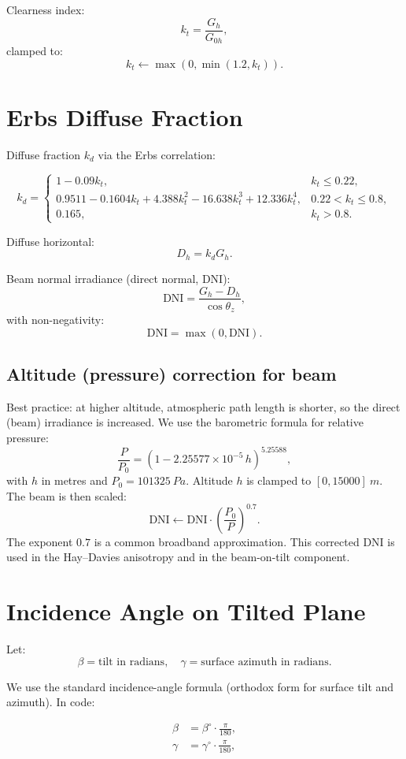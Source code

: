 \documentclass[11pt,a4paper]{article}
\begin{document}
Clearness index:
\[
  k_t = \frac{G_h}{G_{0h}},
\]
clamped to:
\[
  k_t \leftarrow \max(0, \min(1.2, k_t)).
\]

\section{Erbs Diffuse Fraction}

Diffuse fraction \(k_d\) via the Erbs correlation:

\[
k_d =
\begin{cases}
  1 - 0.09 k_t, & k_t \le 0.22,\\[6pt]
  0.9511 - 0.1604 k_t + 4.388 k_t^2 - 16.638 k_t^3 + 12.336 k_t^4, & 0.22 < k_t \le 0.8,\\[6pt]
  0.165, & k_t > 0.8.
\end{cases}
\]

Diffuse horizontal:
\[
  D_h = k_d G_h.
\]

Beam normal irradiance (direct normal, DNI):
\[
  \text{DNI} = \frac{G_h - D_h}{\cos\theta_z},
\]
with non-negativity:
\[
  \text{DNI} = \max(0, \text{DNI}).
\]

\subsection{Altitude (pressure) correction for beam}

Best practice: at higher altitude, atmospheric path length is shorter, so the direct (beam) irradiance is increased. We use the barometric formula for relative pressure:
\[
  \frac{P}{P_0} = \left(1 - 2.25577\times 10^{-5}\, h\right)^{5.25588},
\]
with \(h\) in metres and \(P_0 = 101325\ \si{Pa}\). Altitude \(h\) is clamped to \([0, 15000]\ \si{m}\). The beam is then scaled:
\[
  \text{DNI} \leftarrow \text{DNI} \cdot \left(\frac{P_0}{P}\right)^{0.7}.
\]
The exponent \(0.7\) is a common broadband approximation. This corrected DNI is used in the Hay--Davies anisotropy and in the beam-on-tilt component.

\section{Incidence Angle on Tilted Plane}

Let:
\[
  \beta = \text{tilt in radians}, \quad
  \gamma = \text{surface azimuth in radians}.
\]

We use the standard incidence-angle formula (orthodox form for surface tilt and azimuth).
In code:

\begin{align*}
  \beta  &= \beta^\circ \cdot \frac{\pi}{180},\\
  \gamma &= \gamma^\circ \cdot \frac{\pi}{180},
\end{align*}
\end{document}
